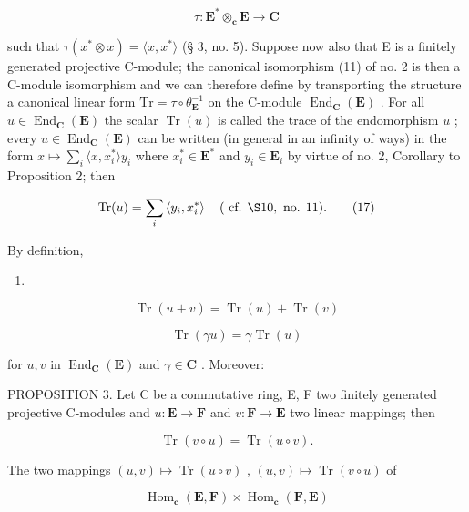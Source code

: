 \[
\tau : \mathbf {E} ^ {*} \otimes_ {\mathbf {c}} \mathbf {E} \rightarrow \mathbf {C}\tag{16}
\]

such that \(\tau(x^{*} \otimes x) = \langle x, x^{*} \rangle\) (§ 3, no. 5). Suppose now also that E is a finitely generated projective C-module; the canonical isomorphism (11) of no. 2 is then a C-module isomorphism and we can therefore define by transporting the structure a canonical linear form \(\mathrm{Tr} = \tau \circ \theta_{\mathbf{E}}^{-1}\) on the C-module \(\operatorname{End}_{\mathbf{C}}(\mathbf{E})\) . For all \(u \in \operatorname{End}_{\mathbf{C}}(\mathbf{E})\) the scalar \(\operatorname{Tr}(u)\) is called the trace of the endomorphism \(u\) ; every \(u \in \operatorname{End}_{\mathbf{C}}(\mathbf{E})\) can be written (in general in an infinity of ways) in the form \(x \mapsto \sum_{i} \langle x, x_{i}^{*} \rangle y_{i}\) where \(x_{i}^{*} \in \mathbf{E}^{*}\) and \(y_{i} \in \mathbf{E}_{i}\) by virtue of no. 2, Corollary to Proposition 2; then

\[
\operatorname{Tr} (u) = \sum_ {i} \left\langle y _ {i}, x _ {i} ^ {*} \right\rangle \quad (\text { cf. } \S 1 0, \text { no. } 1 1).\tag{17}
\]

By definition,

\begin{enumerate}
\def\labelenumi{(\arabic{enumi})}
\setcounter{enumi}{17}
\tightlist
\item
\end{enumerate}

\[
\operatorname{Tr} (u + v) = \operatorname{Tr} (u) + \operatorname{Tr} (v)\tag{19}
\]

\[
\operatorname{Tr} (\gamma u) = \gamma \operatorname{Tr} (u)
\]

for \(u, v\) in \(\operatorname{End}_{\mathbf{C}}(\mathbf{E})\) and \(\gamma \in \mathbf{C}\) . Moreover:

PROPOSITION 3. Let C be a commutative ring, E, F two finitely generated projective C-modules and \(u: \mathbf{E} \to \mathbf{F}\) and \(v: \mathbf{F} \to \mathbf{E}\) two linear mappings; then

\[
\operatorname{Tr} (v \circ u) = \operatorname{Tr} (u \circ v).\tag{20}
\]

The two mappings \((u, v) \mapsto \operatorname{Tr}(u \circ v)\) , \((u, v) \mapsto \operatorname{Tr}(v \circ u)\) of

\[
\operatorname{Hom} _ {\mathbf {c}} (\mathbf {E}, \mathbf {F}) \times \operatorname{Hom} _ {\mathbf {c}} (\mathbf {F}, \mathbf {E})
\]

